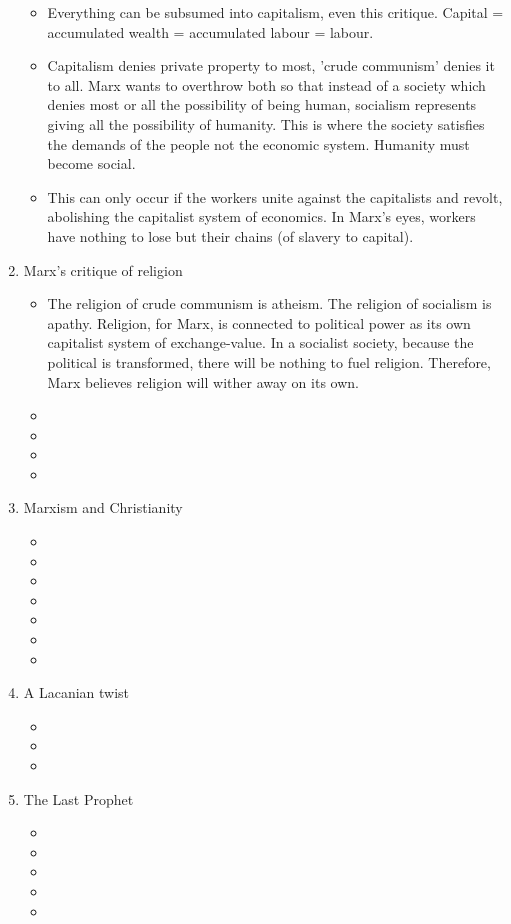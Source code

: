 \begin{enumerate}
\begin{itemize}
		\item Everything can be subsumed into capitalism, even this critique. Capital = accumulated wealth = accumulated labour = labour.
		\item Capitalism denies private property to most, 'crude communism' denies it to all. Marx wants to overthrow both so that instead of a society which denies most or all the possibility of being human, socialism represents giving all the possibility of humanity. This is where the society satisfies the demands of the people not the economic system. Humanity must become social.
		\item This can only occur if the workers unite against the capitalists and revolt, abolishing the capitalist system of economics. In Marx's eyes, workers have nothing to lose but their chains (of slavery to capital).
	\end{itemize}
 	\item Marx's critique of religion
	\begin{itemize}
		\item The religion of crude communism is atheism. The religion of socialism is apathy. Religion, for Marx, is connected to political power as its own capitalist system of exchange-value. In a socialist society, because the political is transformed, there will be nothing to fuel religion. Therefore, Marx believes religion will wither away on its own.
		\item
		\item
		\item
		\item
	\end{itemize}
 	\item Marxism and Christianity
	\begin{itemize}
		\item
		\item
		\item
		\item
		\item
		\item
		\item
	\end{itemize}
	 \item A Lacanian twist
	\begin{itemize}
		\item
		\item
		\item
	\end{itemize}
 	\item The Last Prophet
	\begin{itemize}
		\item
		\item
		\item
		\item
		\item
	\end{itemize}
\end{enumerate}
